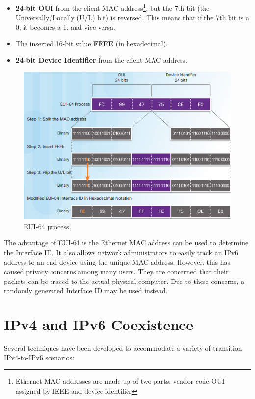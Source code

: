 \begin{itemize}
\item \textbf{24-bit OUI} from the client MAC address\footnote{Ethernet MAC addresses are made up of two parts: vendor code OUI assigned by IEEE and device identifier}, but the 7th bit (the Universally/Locally (U/L) bit) is reversed. This means that if the 7th bit is a 0, it becomes a 1, and vice versa.
\item The inserted 16-bit value \textbf{FFFE} (in hexadecimal).
\item \textbf{24-bit Device Identifier} from the client MAC address.
\end{itemize}

\begin{figure}[hbtp]
\caption{EUI-64 process}\label{EUI64}
\centering
\includegraphics[scale=1]{pictures/EUI64.PNG}
\end{figure}

The advantage of EUI-64 is the Ethernet MAC address can be used to determine the Interface ID. It also allows network administrators to easily track an IPv6 address to an end device using the unique MAC address. However, this has caused privacy concerns among many users. They are concerned that their packets can be traced to the actual physical computer. Due to these concerns, a randomly generated Interface ID may be used instead. 

\section{IPv4 and IPv6 Coexistence}

Several techniques have been developed to accommodate a variety of transition IPv4-to-IPv6 scenarios:

